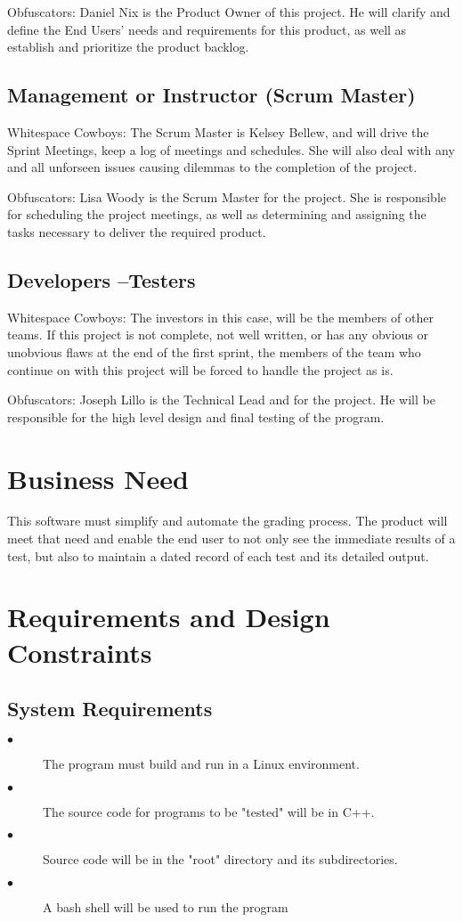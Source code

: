 Obfuscators:
Daniel Nix is the Product Owner of this project.  He will clarify and define the End Users' needs and requirements 
for this product, as well as establish and prioritize the product backlog.

\subsection{Management or Instructor (Scrum Master)}
Whitespace Cowboys:
The Scrum Master is Kelsey Bellew, and will drive the Sprint Meetings, keep a log of
meetings and schedules. She will also deal with any and all unforseen issues causing 
dilemmas to the completion of the project.

Obfuscators:
Lisa Woody is the Scrum Master for the project.  She is responsible for scheduling the project meetings, as well as 
determining and assigning the tasks necessary to deliver the required product.

\subsection{Developers --Testers}
Whitespace Cowboys:
The investors in this case, will be the members of other teams. If this project is not 
complete, not well written, or has any obvious or unobvious flaws at the end of the first
sprint, the members of the team who continue on with this project will be forced to handle
the project as is.

Obfuscators:
Joseph Lillo is the Technical Lead and for the project.  He will be responsible for the high level design and final
testing of the program.

\section{Business Need}
This software must simplify and automate the grading process.  The product will meet that need and enable 
the end user to not only see the immediate results of a test, but also to maintain a dated record of each test
and its detailed output.

\section{Requirements and Design Constraints}

\subsection{System  Requirements}
\begin{description}
\item [$\bullet$] The program must build and run in a Linux environment.
\item [$\bullet$] The source code for programs to be "tested" will be in C++.
\item [$\bullet$] Source code will be in the "root" directory and its subdirectories.
\item [$\bullet$] A bash shell will be used to run the program
\end{description}

